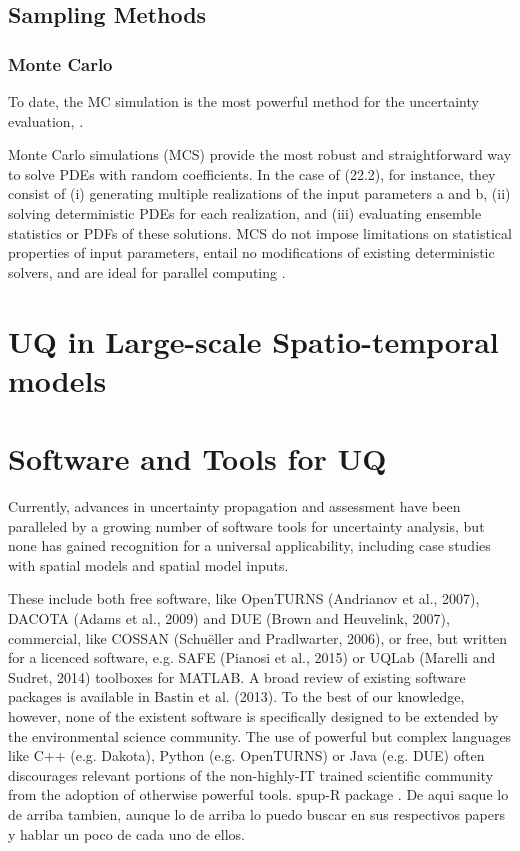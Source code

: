 \subsection{Sampling Methods}

\subsubsection{Monte Carlo}
To date, the MC simulation is the most powerful method for the uncertainty evaluation, \cite{Rajan2016a}.

Monte Carlo simulations (MCS) provide the most robust and straightforward way to
solve PDEs with random coefficients. In the case of (22.2), for instance, they consist
of (i) generating multiple realizations of the input parameters a and b, (ii) solving
deterministic PDEs for each realization, and (iii) evaluating ensemble statistics or
PDFs of these solutions. MCS do not impose limitations on statistical properties of
input parameters, entail no modifications of existing deterministic solvers, and are
ideal for parallel computing \cite{Higdon2017}.

\section{UQ in Large-scale Spatio-temporal models}

\section{Software and Tools for UQ}
Currently, advances in uncertainty propagation and assessment have been paralleled by a growing number of software tools for uncertainty analysis, but none has gained recognition for a universal applicability, including case studies with spatial models and spatial model inputs. \cite{Sawicka2016}

These include both free software, like OpenTURNS (Andrianov et al., 2007), DACOTA (Adams et al., 2009) and DUE (Brown and Heuvelink, 2007), commercial, like COSSAN (Schuëller and Pradlwarter, 2006), or free, but written for a licenced software, e.g. SAFE (Pianosi et al., 2015) or UQLab (Marelli and Sudret, 2014) toolboxes for MATLAB. A broad review of existing software packages is available in Bastin et al. (2013). To the best of our knowledge, however, none of the existent software is specifically designed to be extended by the environmental science community. The use of powerful but complex languages like C++ (e.g. Dakota), Python (e.g. OpenTURNS) or Java (e.g. DUE) often discourages relevant portions of the non-highly-IT trained scientific community from the adoption of otherwise powerful tools.
spup-R package \cite{Sawicka2016}. De aqui saque lo de arriba tambien, aunque lo de arriba lo puedo buscar en sus respectivos papers y hablar un poco de cada uno de ellos.

